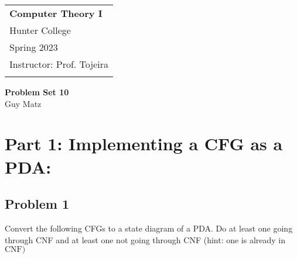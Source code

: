 \documentclass[12pt]{scrbook}
\author{Guy Matz}
\begin{document}
\begin{tabular}{p{15.5cm}}
    {\large \textbf{Computer Theory I}} \\
  Hunter College \\
  Spring 2023  \\
  Instructor: Prof. Tojeira\\
  \hline
  \\
\end{tabular}

\begin{center}
  {\Large \textbf{Problem Set 10}}
  \vspace{2mm}\\
  Guy Matz
\end{center}

\section*{Part 1: Implementing a CFG as a PDA:}
\vspace{0.4cm}
\subsection*{Problem 1}
Convert the following CFGs to a state diagram of a PDA. Do at least one going through CNF and at least one not going through CNF (hint: one is already in $\mathrm{CNF})$
\end{document}
